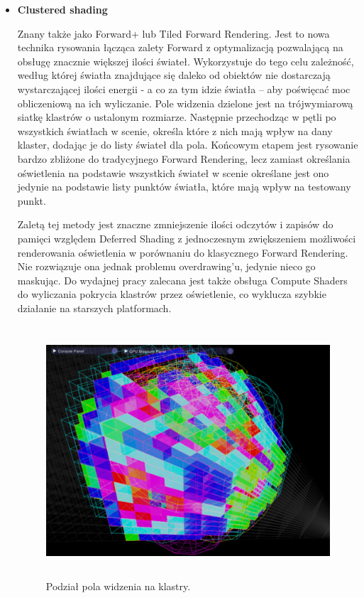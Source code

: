 \begin{itemize}
	\item \textbf{Clustered shading}

	Znany także jako Forward+ lub Tiled Forward Rendering. Jest to nowa technika rysowania łącząca zalety Forward z optymalizacją pozwalającą na obsługę znacznie większej ilości świateł. Wykorzystuje do tego celu zależność, według której światła znajdujące się daleko od obiektów nie dostarczają wystarczającej ilości energii - a co za tym idzie światła -- aby poświęcać moc obliczeniową na ich wyliczanie. Pole widzenia dzielone jest na trójwymiarową siatkę klastrów o ustalonym rozmiarze. Następnie przechodząc w pętli po wszystkich światłach w scenie, określa które z nich mają wpływ na dany klaster, dodając je do listy świateł dla pola. Końcowym etapem jest rysowanie bardzo zbliżone do tradycyjnego Forward Rendering, lecz zamiast określania oświetlenia na podstawie wszystkich świateł w scenie określane jest ono jedynie na podstawie listy punktów światła, które mają wpływ na testowany punkt. \cite{aortiz:clustered:2024}

	Zaletą tej metody jest znaczne zmniejszenie ilości odczytów i zapisów do pamięci względem Deferred Shading z jednoczesnym zwiększeniem możliwości renderowania oświetlenia w porównaniu do klasycznego Forward Rendering. Nie rozwiązuje ona jednak problemu overdrawing'u, jedynie nieco go maskując. Do wydajnej pracy zalecana jest także obsługa Compute Shaders do wyliczania pokrycia klastrów przez oświetlenie, co wyklucza szybkie działanie na starszych platformach.

	\begin{figure}[htbp]
		\centering
		\includegraphics[width=4.94167in,height=3.67203in]{images/2_clustered_field.png}
		\caption{Podział pola widzenia na klastry. \cite{cnblogs:clustered:2024}}
	\end{figure}


\end{itemize}
